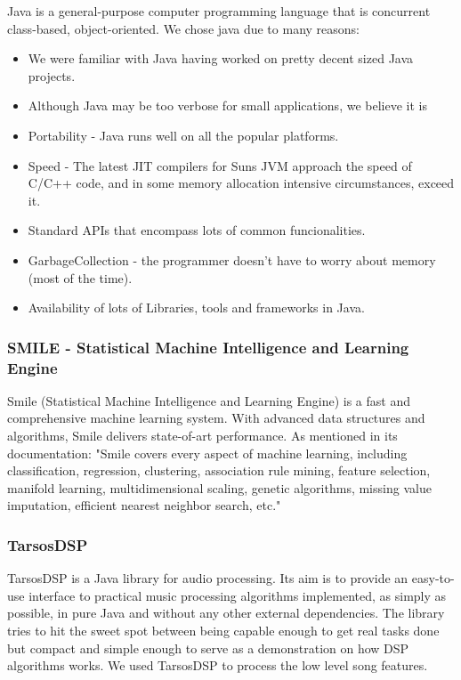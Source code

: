 Java is a general-purpose computer programming language that is concurrent class-based, object-oriented. 
We chose java due to many reasons:

\begin{itemize}
    \item We were familiar with Java having worked on pretty decent sized Java projects.
    \item Although Java may be too verbose for small applications, we believe it is 
    \item Portability - Java runs well on all the popular platforms.
    \item Speed - The latest JIT compilers for Suns JVM approach the speed of C/C++ code, and in some memory allocation intensive circumstances, exceed it.
    \item Standard APIs that encompass lots of common funcionalities.
    \item GarbageCollection - the programmer doesn't have to worry about memory (most of the time).
    \item Availability of lots of Libraries, tools and frameworks in Java.
\end{itemize}

\subsubsection{SMILE - Statistical Machine Intelligence and Learning Engine}

Smile (Statistical Machine Intelligence and Learning Engine) is a fast and comprehensive machine learning system. With advanced data structures and algorithms, Smile delivers state-of-art performance.
As mentioned in its documentation:
"Smile covers every aspect of machine learning, including classification, regression, clustering, association rule mining, feature selection, manifold learning, multidimensional scaling, genetic algorithms, missing value imputation, efficient nearest neighbor search, etc."

\subsubsection{TarsosDSP}

    TarsosDSP is a Java library for audio processing. 
    Its aim is to provide an easy-to-use interface to practical music processing algorithms implemented, as simply as possible, in pure Java and without any other external dependencies. 
    The library tries to hit the sweet spot between being capable enough to get real tasks done but compact and simple enough to serve as a demonstration on how DSP algorithms works.
    We used TarsosDSP to process the low level song features.

